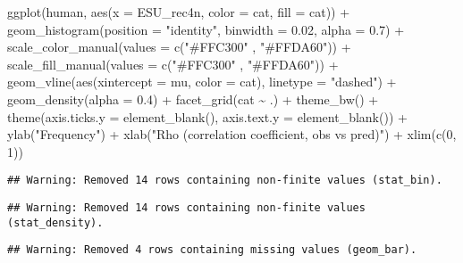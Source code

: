 \documentclass[
]{article}
\newenvironment{Shaded}{\begin{snugshade}}{\end{snugshade}}
\newcommand{\AttributeTok}[1]{\textcolor[rgb]{0.77,0.63,0.00}{#1}}
\newcommand{\DecValTok}[1]{\textcolor[rgb]{0.00,0.00,0.81}{#1}}
\newcommand{\FloatTok}[1]{\textcolor[rgb]{0.00,0.00,0.81}{#1}}
\newcommand{\FunctionTok}[1]{\textcolor[rgb]{0.00,0.00,0.00}{#1}}
\newcommand{\NormalTok}[1]{#1}
\newcommand{\SpecialCharTok}[1]{\textcolor[rgb]{0.00,0.00,0.00}{#1}}
\newcommand{\StringTok}[1]{\textcolor[rgb]{0.31,0.60,0.02}{#1}}
\begin{document}
\begin{Shaded}
\begin{Highlighting}[]
\FunctionTok{ggplot}\NormalTok{(human, }\FunctionTok{aes}\NormalTok{(}\AttributeTok{x =}\NormalTok{ ESU\_rec4n, }\AttributeTok{color =}\NormalTok{ cat, }\AttributeTok{fill =}\NormalTok{ cat)) }\SpecialCharTok{+} 
  \FunctionTok{geom\_histogram}\NormalTok{(}\AttributeTok{position =} \StringTok{"identity"}\NormalTok{, }\AttributeTok{binwidth =} \FloatTok{0.02}\NormalTok{, }\AttributeTok{alpha =} \FloatTok{0.7}\NormalTok{) }\SpecialCharTok{+}
  \FunctionTok{scale\_color\_manual}\NormalTok{(}\AttributeTok{values =} \FunctionTok{c}\NormalTok{(}\StringTok{"\#FFC300"}\NormalTok{ , }\StringTok{"\#FFDA60"}\NormalTok{)) }\SpecialCharTok{+}
  \FunctionTok{scale\_fill\_manual}\NormalTok{(}\AttributeTok{values =} \FunctionTok{c}\NormalTok{(}\StringTok{"\#FFC300"}\NormalTok{ , }\StringTok{"\#FFDA60"}\NormalTok{)) }\SpecialCharTok{+}
  \FunctionTok{geom\_vline}\NormalTok{(}\FunctionTok{aes}\NormalTok{(}\AttributeTok{xintercept =}\NormalTok{ mu, }\AttributeTok{color =}\NormalTok{ cat),}
             \AttributeTok{linetype =} \StringTok{"dashed"}\NormalTok{) }\SpecialCharTok{+}
  \FunctionTok{geom\_density}\NormalTok{(}\AttributeTok{alpha =} \FloatTok{0.4}\NormalTok{) }\SpecialCharTok{+} \FunctionTok{facet\_grid}\NormalTok{(cat }\SpecialCharTok{\textasciitilde{}}\NormalTok{ .) }\SpecialCharTok{+}
  \FunctionTok{theme\_bw}\NormalTok{() }\SpecialCharTok{+}
  \FunctionTok{theme}\NormalTok{(}\AttributeTok{axis.ticks.y =} \FunctionTok{element\_blank}\NormalTok{(),}
        \AttributeTok{axis.text.y =} \FunctionTok{element\_blank}\NormalTok{()) }\SpecialCharTok{+}
  \FunctionTok{ylab}\NormalTok{(}\StringTok{"Frequency"}\NormalTok{) }\SpecialCharTok{+} \FunctionTok{xlab}\NormalTok{(}\StringTok{"Rho (correlation coefficient, obs vs pred)"}\NormalTok{) }\SpecialCharTok{+}
  \FunctionTok{xlim}\NormalTok{(}\FunctionTok{c}\NormalTok{(}\DecValTok{0}\NormalTok{, }\DecValTok{1}\NormalTok{))}
\end{Highlighting}
\end{Shaded}

\begin{verbatim}
## Warning: Removed 14 rows containing non-finite values (stat_bin).
\end{verbatim}

\begin{verbatim}
## Warning: Removed 14 rows containing non-finite values (stat_density).
\end{verbatim}

\begin{verbatim}
## Warning: Removed 4 rows containing missing values (geom_bar).
\end{verbatim}
\end{document}
